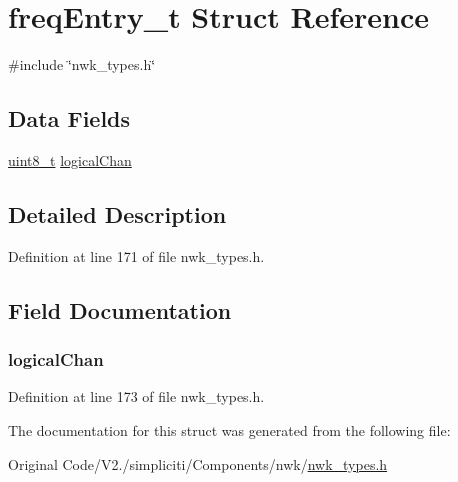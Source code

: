 \hypertarget{structfreqEntry__t}{\section{freq\-Entry\-\_\-t \-Struct \-Reference}
\label{structfreqEntry__t}
}


{\ttfamily \#include \char`\"{}nwk\-\_\-types.\-h\char`\"{}}

\subsection*{\-Data \-Fields}
\begin{DoxyCompactItemize}
\item 
\hyperlink{bsp__msp430__defs_8h_aba7bc1797add20fe3efdf37ced1182c5}{uint8\-\_\-t} \hyperlink{structfreqEntry__t_afb2c0884696beb10e8d2813ad6765cbb}{logical\-Chan}
\end{DoxyCompactItemize}


\subsection{\-Detailed \-Description}


\-Definition at line 171 of file nwk\-\_\-types.\-h.



\subsection{\-Field \-Documentation}
\hypertarget{structfreqEntry__t_afb2c0884696beb10e8d2813ad6765cbb}{
\subsubsection[{logical\-Chan}]{ {\bf logical\-Chan}}}\label{structfreqEntry__t_afb2c0884696beb10e8d2813ad6765cbb}


\-Definition at line 173 of file nwk\-\_\-types.\-h.



\-The documentation for this struct was generated from the following file\-:\begin{DoxyCompactItemize}
\item 
\-Original Code/\-V2./simpliciti/\-Components/nwk/\hyperlink{nwk__types_8h}{nwk\-\_\-types.\-h}\end{DoxyCompactItemize}
